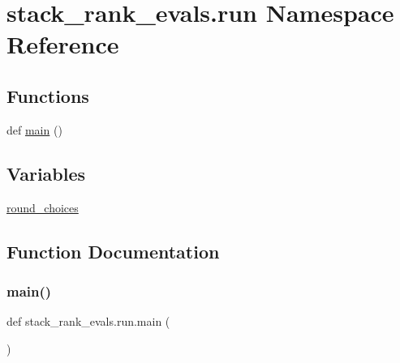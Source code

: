\hypertarget{namespacestack__rank__evals_1_1run}{}\section{stack\+\_\+rank\+\_\+evals.\+run Namespace Reference}
\label{namespacestack__rank__evals_1_1run}
\subsection*{Functions}
\begin{DoxyCompactItemize}
\item 
def \hyperlink{namespacestack__rank__evals_1_1run_a5e968ebe737f4f8e703b5be5bec893bf}{main} ()
\end{DoxyCompactItemize}
\subsection*{Variables}
\begin{DoxyCompactItemize}
\item 
\hyperlink{namespacestack__rank__evals_1_1run_a7da608ae54872ed1fb55c4c87600cf99}{round\+\_\+choices}
\end{DoxyCompactItemize}


\subsection{Function Documentation}
\mbox{\label{namespacestack__rank__evals_1_1run_a5e968ebe737f4f8e703b5be5bec893bf}} 
\subsubsection{\texorpdfstring{main()}{main()}}
{\footnotesize\ttfamily def stack\+\_\+rank\+\_\+evals.\+run.\+main (\begin{DoxyParamCaption}{ }\end{DoxyParamCaption})}

